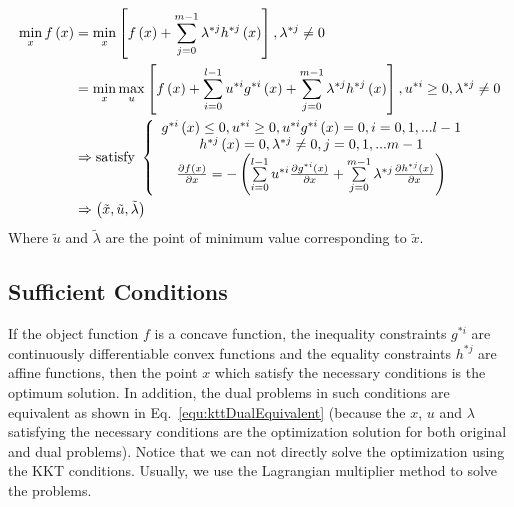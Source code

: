\documentclass[runningheads,openany]{xhlPaper}
\begin{document}
\begin{equation}
\label{equ:kttNecessaryConditions}
\begin{aligned}
\mathop {\min }\limits_x f\left( x \right) &= \mathop {\min }\limits_x \left[ {f\left( x \right) + \sum\limits_{j = 0}^{m - 1} {{\lambda ^{*j}}{h^{*j}}\left( x \right)} } \right],{\lambda ^{*j}} \ne 0\\
 &= \mathop {\min }\limits_x \mathop {\max }\limits_u \left[ {f\left( x \right) + \sum\limits_{i = 0}^{l - 1} {{u^{*i}}{g^{*i}}\left( x \right)}  + \sum\limits_{j = 0}^{m - 1} {{\lambda ^{*j}}{h^{*j}}\left( x \right)} } \right],{u^{*i}} \ge 0,{\lambda ^{*j}} \ne 0\\
 &\Rightarrow {\rm{satisfy}}\ \left\{ {\begin{array}{*{20}{c}}
{{g^{*i}}\left( x \right) \le 0,{u^{*i}} \ge 0,{u^{*i}}{g^{*i}}\left( x \right) = 0,i = 0,1,...l - 1}\\
{{h^{*j}}\left( x \right) = 0,{\lambda ^{*j}} \ne 0,j = 0,1,...m - 1}\\
{\frac{{\partial f\left( x \right)}}{{\partial x}} =  - \left( {\sum\limits_{i = 0}^{l - 1} {{u^{*i}}} \frac{{\partial {g^{*i}}\left( x \right)}}{{\partial x}} + \sum\limits_{j = 0}^{m - 1} {{\lambda ^{*j}}} \frac{{\partial {h^{*j}}\left( x \right)}}{{\partial x}}} \right)}
\end{array}} \right.\\
 &\Rightarrow \left( {\tilde x,\tilde u,\tilde \lambda } \right)
\end{aligned}
\end{equation}
Where $\tilde{u}$ and $\tilde{\lambda}$ are the point of minimum value corresponding to $\tilde{x}$.

\subsection{Sufficient Conditions}
\label{sec:kktSufficientConditions}
If the object function $f$ is a concave function, the inequality constraints $g^{*i}$ are continuously differentiable convex functions and the equality constraints $h^{*j}$ are affine functions, then the point $x$ which satisfy the necessary conditions is the optimum solution. In addition, the dual problems  in such conditions are equivalent as shown in Eq.~\ref{equ:kttDualEquivalent} (because the $x$, $u$ and $\lambda$ satisfying the necessary conditions are the optimization solution for both original and dual problems). Notice that we can not directly solve the optimization using the KKT conditions. Usually, we use the Lagrangian multiplier method to solve the problems.
\end{document}
